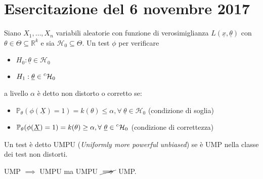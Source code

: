 \documentclass[hidelinks, 10pt]{report}
\begin{document}
\section{Esercitazione del 6 novembre 2017}
\begin{defn}
Siano $ X_{1}, \dotsc, X_{n} $ variabili aleatorie con funzione di verosimiglianza $ L(\underline{x}, \underline{\theta}) $ con $ \theta \in \Theta \subseteq \mathbb{R}^{k} $ e sia $ \mathcal{H}_{0} \subseteq \Theta $. Un test $ \phi $ per verificare
\begin{itemize}
\item $ H_{0} : \underline{\theta} \in \mathcal{H}_{0} $
\item $ H_{1} : \underline{\theta} \in \prescript{c}{}{\mathcal{H}_{0}} $
\end{itemize}

a livello $ \alpha $ \`e detto non distorto o corretto se:
\begin{itemize}
\item $ \mathbb{P}_{\theta} (\phi(\underline{X}) = 1) = k(\theta) \le \alpha, \forall\ \underline{\theta} \in \mathcal{H}_{0} $ (condizione di soglia)
\item $ \mathbb{P}_{\theta} (\phi(\underline{X}) = 1) = k(\theta) \ge \alpha, \forall\ \underline{\theta} \in \compl{\mathcal{H}_{0}} $ (condizione di correttezza)
\end{itemize}
\end{defn}

\begin{defn}
Un test \`e detto UMPU (\emph{Uniformly more powerful unbiased}) se \`e UMP nella classe dei test non distorti.
\end{defn}

\begin{oss}
UMP $ \implies $ UMPU ma UMPU $ \cancel{\implies} $ UMP.
\end{oss}
\end{document}
